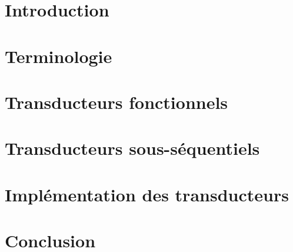 \documentclass[12pt,twoside,openleft]{book}
\begin{document}
	\pagestyle{fancy}
	\chapter{Introduction}
	\setcounter{page}{1}
	

	\chapter{Terminologie}
	

	\chapter{Transducteurs fonctionnels}
	

	\chapter{Transducteurs sous-séquentiels}
	

	\chapter{Implémentation des transducteurs}
	
	
	\chapter{Conclusion}
	

    \newpage
	
	
	
	\appendix
	
\end{document}
